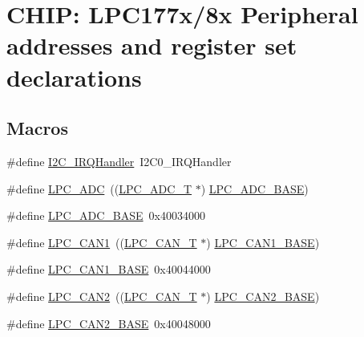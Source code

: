 \hypertarget{group__PERIPH__177X__8X__BASE}{}\section{C\+H\+IP\+: L\+P\+C177x/8x Peripheral addresses and register set declarations}
\label{group__PERIPH__177X__8X__BASE}
\subsection*{Macros}
\begin{DoxyCompactItemize}
\item 
\#define \hyperlink{group__PERIPH__177X__8X__BASE_ga78bc9c1986ea5da20688e1db532c5717}{I2\+C\+\_\+\+I\+R\+Q\+Handler}~I2\+C0\+\_\+\+I\+R\+Q\+Handler
\item 
\#define \hyperlink{group__PERIPH__177X__8X__BASE_gab6eaf639d3a1eec83583a9e11ab7336f}{L\+P\+C\+\_\+\+A\+DC}~((\hyperlink{structLPC__ADC__T}{L\+P\+C\+\_\+\+A\+D\+C\+\_\+T}              $\ast$) \hyperlink{group__PERIPH__407X__8X__BASE_ga2396e0d0c565e4c1c3b2fc593bd6c37f}{L\+P\+C\+\_\+\+A\+D\+C\+\_\+\+B\+A\+SE})
\item 
\#define \hyperlink{group__PERIPH__177X__8X__BASE_ga2396e0d0c565e4c1c3b2fc593bd6c37f}{L\+P\+C\+\_\+\+A\+D\+C\+\_\+\+B\+A\+SE}~0x40034000
\item 
\#define \hyperlink{group__PERIPH__177X__8X__BASE_ga2f006d6888921f8336dce504eb56f4aa}{L\+P\+C\+\_\+\+C\+A\+N1}~((\hyperlink{structLPC__CAN__T}{L\+P\+C\+\_\+\+C\+A\+N\+\_\+T}              $\ast$) \hyperlink{group__PERIPH__407X__8X__BASE_gaf2407c1927ebddd767832aefa74c3398}{L\+P\+C\+\_\+\+C\+A\+N1\+\_\+\+B\+A\+SE})
\item 
\#define \hyperlink{group__PERIPH__177X__8X__BASE_gaf2407c1927ebddd767832aefa74c3398}{L\+P\+C\+\_\+\+C\+A\+N1\+\_\+\+B\+A\+SE}~0x40044000
\item 
\#define \hyperlink{group__PERIPH__177X__8X__BASE_ga838776140ad5e0156715278f8bb0652d}{L\+P\+C\+\_\+\+C\+A\+N2}~((\hyperlink{structLPC__CAN__T}{L\+P\+C\+\_\+\+C\+A\+N\+\_\+T}              $\ast$) \hyperlink{group__PERIPH__407X__8X__BASE_gab9608b3b72dd843a25910dd2a809106b}{L\+P\+C\+\_\+\+C\+A\+N2\+\_\+\+B\+A\+SE})
\item 
\#define \hyperlink{group__PERIPH__177X__8X__BASE_gab9608b3b72dd843a25910dd2a809106b}{L\+P\+C\+\_\+\+C\+A\+N2\+\_\+\+B\+A\+SE}~0x40048000
\item 

\end{DoxyCompactItemize}
